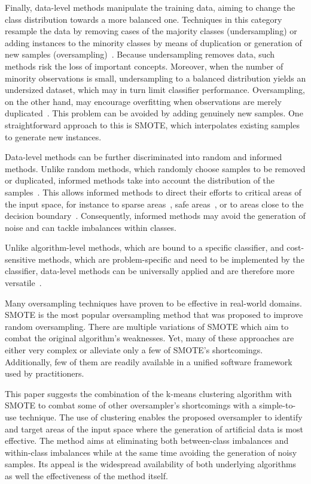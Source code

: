 \documentclass[sort&compress]{elsarticle}
\begin{document}
Finally, data-level methods manipulate the training data, aiming to change the
class distribution towards a more balanced one. Techniques in this category
resample the data by removing cases of the majority classes (undersampling) or
adding instances to the minority classes by means of duplication or generation
of new samples (oversampling)~\citep{Kotsiantis.2006,Galar.2012}. Because
undersampling removes data, such methods risk the loss of important concepts.
Moreover, when the number of minority observations is small, undersampling to a
balanced distribution yields an undersized dataset, which may in turn limit
classifier performance. Oversampling, on the other hand, may encourage
overfitting when observations are merely duplicated~\citep{Weiss.2007}. This
problem can be avoided by adding genuinely new samples. One straightforward
approach to this is \ac{SMOTE}, which interpolates existing samples to generate
new instances. 

Data-level methods can be further discriminated into random and informed
methods. Unlike random methods, which randomly choose samples to be removed or
duplicated, informed methods take into account the distribution of the
samples~\citep{Chawla.2004}. This allows informed methods to direct their
efforts to critical areas of the input space, for instance to sparse
areas~\citep{Nickerson.2001}, safe areas~\citep{Bunkhumpornpat.2009}, or to
areas close to the decision boundary~\citep{Han.2005}. Consequently, informed
methods may avoid the generation of noise and can tackle imbalances within
classes.

Unlike algorithm-level methods, which are bound to a specific classifier, and
cost-sensitive methods, which are problem-specific and need to be implemented by
the classifier, data-level methods can be universally applied and are therefore
more versatile~\citep{Galar.2012}.

Many oversampling techniques have proven to be effective in real-world domains.
\ac{SMOTE} is the most popular oversampling method that was proposed to improve
random oversampling. There are multiple variations of \ac{SMOTE} which aim to
combat the original algorithm's weaknesses. Yet, many of these approaches are
either very complex or alleviate only a few of \ac{SMOTE}'s shortcomings.
Additionally, few of them are readily available in a unified software framework
used by practitioners.

This paper suggests the combination of the k-means clustering algorithm with
\ac{SMOTE} to combat some of other oversampler's shortcomings with a
simple-to-use technique. The use of clustering enables the proposed oversampler
to identify and target areas of the input space where the generation of
artificial data is most effective. The method aims at eliminating both
between-class imbalances and within-class imbalances while at the same time
avoiding the generation of noisy samples. Its appeal is the widespread
availability of both underlying algorithms as well the effectiveness of the
method itself.
\end{document}

